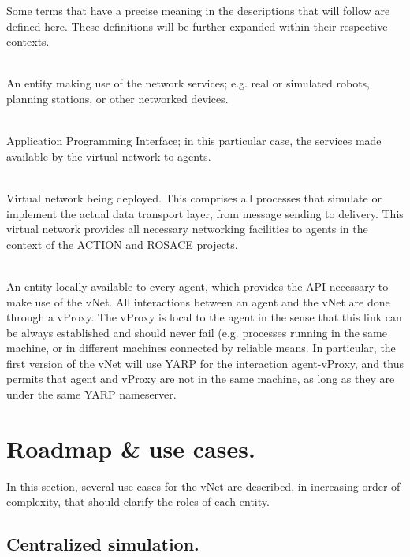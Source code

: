 \documentclass[a4paper,11pt]{article}
\begin{document}
Some terms that have a precise meaning in the descriptions that will follow are defined here. These definitions will be further expanded within their respective contexts.

\begin{description}
    \newcommand{\define}[2]{\item[#1:]\hfill\\#2.}
    
    \define{Agent}{An entity making use of the network services; e.g. real or simulated robots, planning stations, or other networked devices}
    
    \define{API}{Application Programming Interface; in this particular case, the services made available by the virtual network to agents}
    
    \define{vNet}{Virtual network being deployed. This comprises all processes that simulate or implement the actual data transport layer, from message sending to delivery. This virtual network provides all necessary networking facilities to agents in the context of the ACTION and ROSACE projects}
    
    \define{vProxy}{An entity locally available to every agent, which provides the API necessary to make use of the vNet. All interactions between an agent and the vNet are done through a vProxy. The vProxy is local to the agent in the sense that this link can be always established and should never fail (e.g. processes running in the same machine, or in different machines connected by reliable means. In particular, the first version of the vNet will use YARP for the interaction agent-vProxy, and thus permits that agent and vProxy are not in the same machine, as long as they are under the same YARP nameserver}
    
    
\end{description}

\section{Roadmap \& use cases.}

In this section, several use cases for the vNet are described, in increasing order of complexity, that should clarify the roles of each entity.

\subsection{Centralized simulation.}
\end{document}

